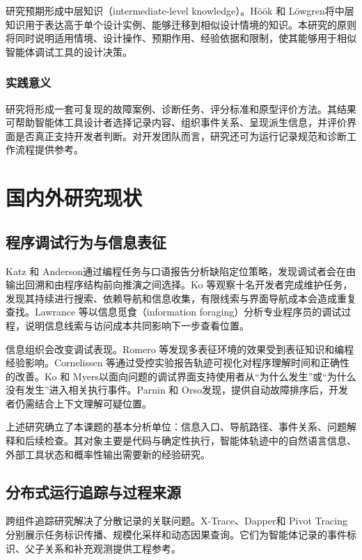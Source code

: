 研究预期形成中层知识（intermediate-level knowledge）。Höök 和 Löwgren\cite{hook2012strong}将中层知识用于表达高于单个设计实例、能够迁移到相似设计情境的知识。本研究的原则将同时说明适用情境、设计操作、预期作用、经验依据和限制，使其能够用于相似智能体调试工具的设计决策。

\subsubsection{实践意义}

研究将形成一套可复现的故障案例、诊断任务、评分标准和原型评价方法。其结果可帮助智能体工具设计者选择记录内容、组织事件关系、呈现派生信息，并评价界面是否真正支持开发者判断。对开发团队而言，研究还可为运行记录规范和诊断工作流程提供参考。

\section{国内外研究现状}

\subsection{程序调试行为与信息表征}

Katz 和 Anderson\cite{ref15}通过编程任务与口语报告分析缺陷定位策略，发现调试者会在由输出回溯和由程序结构前向推演之间选择。Ko 等\cite{ref14}观察十名开发者完成维护任务，发现其持续进行搜索、依赖导航和信息收集，有限线索与界面导航成本会造成重复查找。Lawrance 等\cite{ref08}以信息觅食（information foraging）分析专业程序员的调试过程，说明信息线索与访问成本共同影响下一步查看位置。

信息组织会改变调试表现。Romero 等\cite{ref34}发现多表征环境的效果受到表征知识和编程经验影响。Cornelissen 等\cite{ref33}通过受控实验报告轨迹可视化对程序理解时间和正确性的改善。Ko 和 Myers\cite{ref06}\cite{ref05}\cite{ref07}以面向问题的调试界面支持使用者从“为什么发生”或“为什么没有发生”进入相关执行事件。Parnin 和 Orso\cite{ref35}发现，提供自动故障排序后，开发者仍需结合上下文理解可疑位置。

上述研究确立了本课题的基本分析单位：信息入口、导航路径、事件关系、问题解释和后续检查。其对象主要是代码与确定性执行，智能体轨迹中的自然语言信息、外部工具状态和概率性输出需要新的经验研究。

\subsection{分布式运行追踪与过程来源}

跨组件追踪研究解决了分散记录的关联问题。X-Trace\cite{ref30}、Dapper\cite{ref32}和 Pivot Tracing\cite{ref31}分别展示任务标识传播、规模化采样和动态因果查询。它们为智能体记录的事件标识、父子关系和补充观测提供工程参考。

